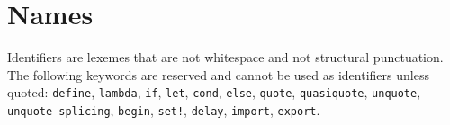 \section{Names}

Identifiers are lexemes that are not whitespace and not structural punctuation.
The following keywords are reserved and cannot be used as identifiers unless
quoted: \texttt{define}, \texttt{lambda}, \texttt{if}, \texttt{let},
\texttt{cond}, \texttt{else}, \texttt{quote}, \texttt{quasiquote},
\texttt{unquote}, \texttt{unquote-splicing}, \texttt{begin}, \texttt{set!},
\texttt{delay}, \texttt{import}, \texttt{export}.
